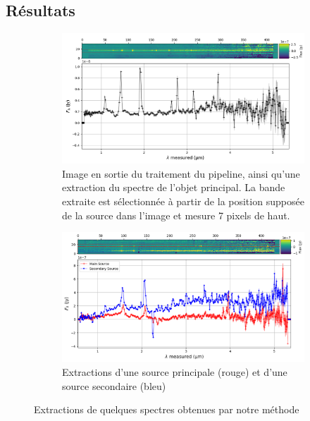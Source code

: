 \documentclass[11pt, a4paper]{article}
\begin{document}
\subsection{Résultats}

\begin{figure}[!h]
  \begin{subfigure}[t]{0.48\textwidth}
      \centering
      \includegraphics[width=1\textwidth]{assets/jw01345-o063_s32304_nirspec_clear-prism_extracted.png}
      \caption{Image en sortie du traitement du pipeline, ainsi qu'une extraction du spectre de l'objet principal. La bande extraite est sélectionnée à partir de la position supposée de la source dans l'image et mesure 7 pixels de haut.}
      \label{fig:extraction_32304}
  \end{subfigure}
  \hfill
  \begin{subfigure}[t]{0.48\textwidth}
      \centering
      \includegraphics[width=1\textwidth]{assets/extraction_2_sources_P7-23642.png}
      \caption{Extractions d'une source principale (rouge) et d'une source secondaire (bleu)}
      \label{fig:extraction_2_sources}
  \end{subfigure}
  \caption{Extractions de quelques spectres obtenues par notre méthode}
\end{figure}
\end{document}
